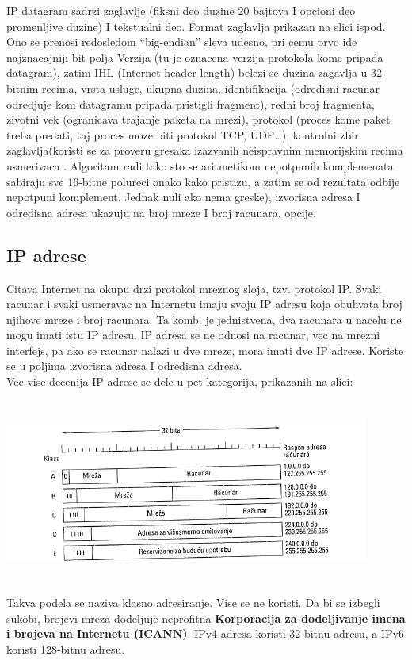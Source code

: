 \documentclass{article} %
\begin{document}
IP datagram sadrzi zaglavlje (fiksni deo duzine 20 bajtova I opcioni deo promenljive duzine) I tekstualni deo. Format zaglavlja prikazan na slici ispod. Ono se prenosi redosledom  “big-endian” sleva udesno, pri cemu prvo ide najznacajniji bit polja Verzija (tu je oznacena verzija protokola kome pripada datagram), zatim IHL (Internet header length) belezi se duzina zagavlja u 32-bitnim recima, vrsta usluge, ukupna duzina, identifikacija (odredisni racunar odredjuje kom  datagramu pripada pristigli fragment), redni broj fragmenta, zivotni vek (ogranicava trajanje paketa na mrezi), protokol (proces kome paket treba predati, taj proces moze biti protokol TCP, UDP…), kontrolni zbir zaglavlja(koristi se za proveru gresaka izazvanih neispravnim memorijskim recima usmerivaca . Algoritam radi tako sto se aritmetikom nepotpunih komplemenata sabiraju sve 16-bitne polureci onako kako pristizu, a zatim se od rezultata odbije nepotpuni komplement. Jednak nuli ako nema greske), izvorisna adresa I odredisna adresa ukazuju na broj mreze I broj racunara, opcije.
\subsection{IP adrese}
Citava Internet na okupu drzi protokol mreznog sloja, tzv. protokol IP.
Svaki racunar i svaki usmeravac na Internetu imaju svoju IP adresu koja obuhvata broj njihove mreze i broj racunara. Ta komb. je jednistvena, dva racunara u nacelu ne mogu imati istu IP adresu. IP adresa se ne odnosi na racunar,  vec na mrezni interfejs, pa ako se racunar nalazi u dve mreze, mora imati dve IP adrese. Koriste se u poljima izvorisna adresa I odredisna adresa. \\

Vec vise decenija IP adrese se dele u pet kategorija, prikazanih na slici:
 \begin{center}
\includegraphics[width=12cm, height=6cm]{klasnoAdr}\\
\end{center}
 Takva podela se naziva klasno adresiranje. Vise se ne koristi. Da bi se izbegli sukobi, brojevi mreza dodeljuje neprofitna \textbf{Korporacija za dodeljivanje imena i brojeva na Internetu (ICANN)}.
IPv4 adresa koristi 32-bitnu adresu, a  IPv6 koristi 128-bitnu adresu.\\
\end{document}
